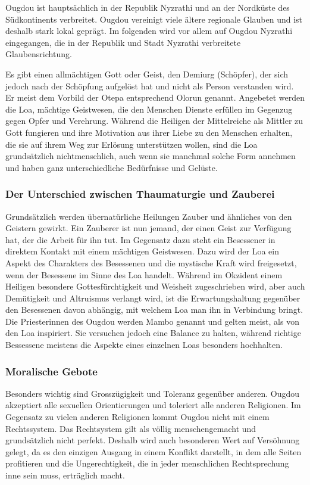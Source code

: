 \documentclass[10pt,twoside,twocolumn,openany]{book}
\begin{document}
\begin{multicols}{2}
Ougdou ist hauptsächlich in der Republik Nyzrathi und an der Nordküste des Südkontinents verbreitet. Ougdou vereinigt viele ältere regionale Glauben und ist deshalb stark lokal geprägt. Im folgenden wird vor allem auf Ougdou Nyzrathi eingegangen, die in der Republik und Stadt Nyzrathi verbreitete Glaubensrichtung.

Es gibt einen allmächtigen Gott oder Geist, den Demiurg (Schöpfer), der sich jedoch nach der Schöpfung aufgelöst hat und nicht als Person verstanden wird. Er meist dem Vorbild der Otepa entsprechend Olorun genannt. Angebetet werden die Loa, mächtige Geistwesen, die den Menschen Dienste erfüllen im Gegenzug gegen Opfer und Verehrung. Während die Heiligen der Mittelreiche als Mittler zu Gott fungieren und ihre Motivation aus ihrer Liebe zu den Menschen erhalten, die sie auf ihrem Weg zur Erlösung unterstützen wollen, sind die Loa grundsätzlich nichtmenschlich, auch wenn sie manchmal solche Form annehmen und haben ganz unterschiedliche Bedürfnisse und Gelüste.

\subsubsection{Der Unterschied zwischen Thaumaturgie und Zauberei}
Grundsätzlich werden übernatürliche Heilungen Zauber und ähnliches von den Geistern gewirkt. Ein Zauberer ist nun jemand, der einen Geist zur Verfügung hat, der die Arbeit für ihn tut. Im Gegensatz dazu steht ein Besessener in direktem Kontakt mit einem mächtigen Geistwesen. Dazu wird der Loa ein Aspekt des Charakters des Besessenen und die mystische Kraft wird freigesetzt, wenn der Besessene im Sinne des Loa handelt. Während im Okzident einem Heiligen besondere Gottesfürchtigkeit und Weisheit zugeschrieben wird, aber auch Demütigkeit und Altruismus verlangt wird, ist die Erwartungshaltung gegenüber den Besessenen davon abhängig, mit welchem Loa man ihn in Verbindung bringt. Die Priesterinnen des Ougdou werden Mambo genannt und gelten meist, als von den Loa inspiriert. Sie versuchen jedoch eine Balance zu halten, während richtige Bessessene meistens die Aspekte eines einzelnen Loas besonders hochhalten.

\subsubsection{Moralische Gebote}
Besonders wichtig sind Grosszügigkeit und Toleranz gegenüber anderen. Ougdou akzeptiert alle sexuellen Orientierungen und toleriert alle anderen Religionen. Im Gegensatz zu vielen anderen Religionen kommt Ougdou nicht mit einem Rechtssystem. Das Rechtsystem gilt als völlig menschengemacht und grundsätzlich nicht perfekt. Deshalb wird auch besonderen Wert auf Versöhnung gelegt, da es den einzigen Ausgang in einem Konflikt darstellt, in dem alle Seiten profitieren und die Ungerechtigkeit, die in jeder menschlichen Rechtsprechung inne sein muss, erträglich macht.
\end{multicols}
\end{document}
